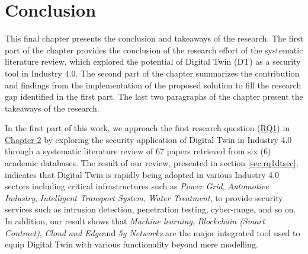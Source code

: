 

\chapter{Conclusion}
\label{Chapter6} %

This final chapter presents the conclusion and takeaways of the research. The first part of the chapter provides the conclusion of the research effort of the systematic literature review, which explored the potential of Digital Twin (DT) as a security tool in Industry 4.0. The second part of the chapter summarizes the contribution and findings from the implementation of the proposed solution to fill the research gap identified in the first part. The last two paragraphs of the chapter present the takeaways of the research.



In the first part of this work, we approach the first research question (\hyperref[lbl:rq1]{RQ1}) in \hyperref[Chapter2]{Chapter 2} by exploring the security application of Digital Twin in Industry 4.0 through a systematic literature review of 67 papers retrieved from six (6) academic databases. The result of our review, presented in section \ref{sec:rq1dtsec}, indicates that Digital Twin is rapidly being adopted in various Industry 4.0 sectors including critical infrastructures such as \textit{Power Grid}, \textit{Automotive Industry}, \textit{Intelligent Transport System}, \textit{Water Treatment}, to provide security services such as intrusion detection, penetration testing, cyber-range, and so on. In addition, our result shows that \textit{Machine learning}, \textit{Blockchain (Smart Contract)}, \textit{Cloud and Edge}and \textit{5g Networks} are the major integrated tool used to equip Digital Twin with various functionality beyond mere modelling. 

